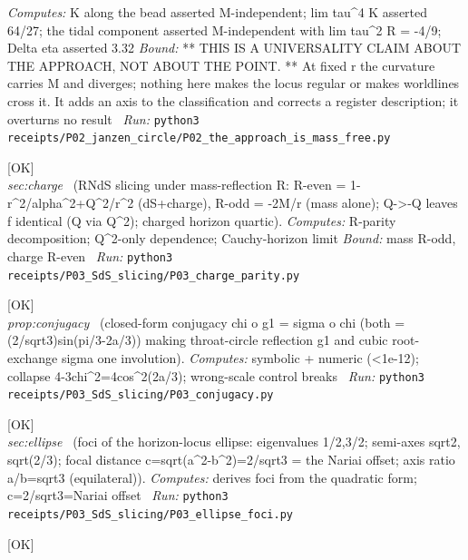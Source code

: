 \begin{description}
\emph{Computes:} K along the bead asserted M-independent; lim tau\textasciicircum{}4 K asserted 64/27; the tidal component asserted M-independent with lim tau\textasciicircum{}2 R = -4/9; \textbar{}Delta eta\textbar{} asserted 3.32
 \emph{Bound:} ** THIS IS A UNIVERSALITY CLAIM ABOUT THE APPROACH, NOT ABOUT THE POINT. ** At fixed r the curvature carries M and diverges; nothing here makes the locus regular or makes worldlines cross it. It adds an axis to the classification and corrects a register description; it overturns no result
\ \emph{Run:} \texttt{python3 receipts/P02\_janzen\_circle/P02\_the\_approach\_is\_mass\_free.py}
\item[\label{rcpt:P03_charge_parity}\texttt{P03\_charge\_parity}]\hfill\textsf{[OK]}\\
\textit{sec:charge} \ (RNdS slicing under mass-reflection R: R-even = 1-r\textasciicircum{}2/alpha\textasciicircum{}2+Q\textasciicircum{}2/r\textasciicircum{}2 (dS+charge), R-odd = -2M/r (mass alone); Q->-Q leaves f identical (Q via Q\textasciicircum{}2); charged horizon quartic). 
\emph{Computes:} R-parity decomposition; Q\textasciicircum{}2-only dependence; Cauchy-horizon limit
 \emph{Bound:} mass R-odd, charge R-even
\ \emph{Run:} \texttt{python3 receipts/P03\_SdS\_slicing/P03\_charge\_parity.py}
\item[\label{rcpt:P03_conjugacy}\texttt{P03\_conjugacy}]\hfill\textsf{[OK]}\\
\textit{prop:conjugacy} \ (closed-form conjugacy chi o g1 = sigma o chi (both = (2/sqrt3)sin(pi/3-2a/3)) making throat-circle reflection g1 and cubic root-exchange sigma one involution). 
\emph{Computes:} symbolic + numeric (<1e-12); collapse 4-3chi\textasciicircum{}2=4cos\textasciicircum{}2(2a/3); wrong-scale control breaks
\ \emph{Run:} \texttt{python3 receipts/P03\_SdS\_slicing/P03\_conjugacy.py}
\item[\label{rcpt:P03_ellipse_foci}\texttt{P03\_ellipse\_foci}]\hfill\textsf{[OK]}\\
\textit{sec:ellipse} \ (foci of the horizon-locus ellipse: eigenvalues 1/2,3/2; semi-axes sqrt2, sqrt(2/3); focal distance c=sqrt(a\textasciicircum{}2-b\textasciicircum{}2)=2/sqrt3 = the Nariai offset; axis ratio a/b=sqrt3 (equilateral)). 
\emph{Computes:} derives foci from the quadratic form; c=2/sqrt3=Nariai offset
\ \emph{Run:} \texttt{python3 receipts/P03\_SdS\_slicing/P03\_ellipse\_foci.py}
\item[\label{rcpt:P03_the_foci_are_chart_objects}\texttt{P03\_the\_foci\_are\_chart\_objects}]\hfill\textsf{[OK]}\\

\end{description}
